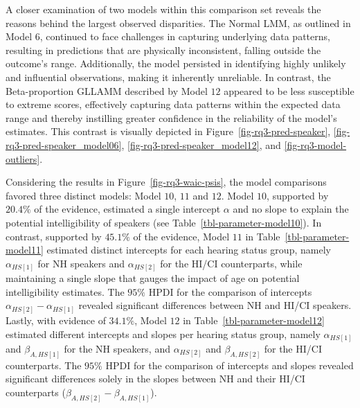 \documentclass[
  authoryear,
  preprint,
  1p]{elsarticle}
\begin{document}
A closer examination of two models within this comparison set reveals
the reasons behind the largest observed disparities. The Normal LMM, as
outlined in Model \(6\), continued to face challenges in capturing
underlying data patterns, resulting in predictions that are physically
inconsistent, falling outside the outcome's range. Additionally, the
model persisted in identifying highly unlikely and influential
observations, making it inherently unreliable. In contrast, the
Beta-proportion GLLAMM described by Model \(12\) appeared to be less
susceptible to extreme scores, effectively capturing data patterns
within the expected data range and thereby instilling greater confidence
in the reliability of the model's estimates. This contrast is visually
depicted in Figure~\ref{fig-rq3-pred-speaker},
\ref{fig-rq3-pred-speaker_model06}, \ref{fig-rq3-pred-speaker_model12},
and \ref{fig-rq3-model-outliers}.

Considering the results in Figure~\ref{fig-rq3-waic-psis}, the model
comparisons favored three distinct models: Model \(10\), \(11\) and
\(12\). Model \(10\), supported by \(20.4\%\) of the evidence, estimated
a single intercept \(\alpha\) and no slope to explain the potential
intelligibility of speakers (see Table~\ref{tbl-parameter-model10}). In
contrast, supported by \(45.1\%\) of the evidence, Model \(11\) in
Table~\ref{tbl-parameter-model11} estimated distinct intercepts for each
hearing status group, namely \(\alpha_{HS[1]}\) for NH speakers and
\(\alpha_{HS[2]}\) for the HI/CI counterparts, while maintaining a
single slope that gauges the impact of age on potential intelligibility
estimates. The \(95\%\) HPDI for the comparison of intercepts
\(\alpha_{HS[2]}-\alpha_{HS[1]}\) revealed significant differences
between NH and HI/CI speakers. Lastly, with evidence of \(34.1\%\),
Model \(12\) in Table~\ref{tbl-parameter-model12} estimated different
intercepts and slopes per hearing status group, namely
\(\alpha_{HS[1]}\) and \(\beta_{A,HS[1]}\) for the NH speakers, and
\(\alpha_{HS[2]}\) and \(\beta_{A,HS[2]}\) for the HI/CI counterparts.
The \(95\%\) HPDI for the comparison of intercepts and slopes revealed
significant differences solely in the slopes between NH and their HI/CI
counterparts (\(\beta_{A,HS[2]}-\beta_{A,HS[1]}\)).
\end{document}
